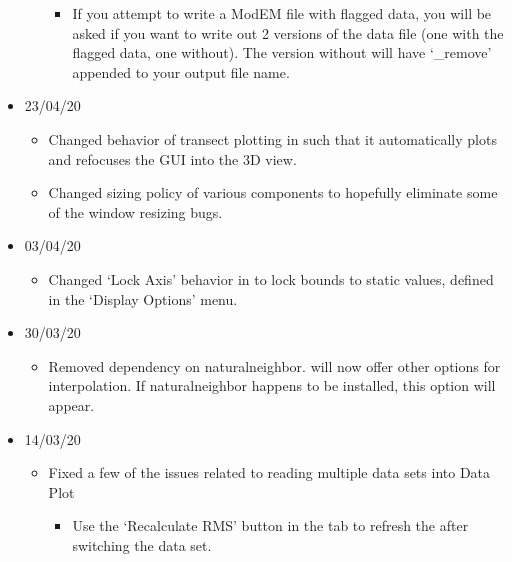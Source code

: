 \documentclass[letterpaper,10pt,english]{sphinxmanual}
\begin{document}
\begin{itemize}
\begin{itemize}
\begin{itemize}
\item {} 
If you attempt to write a ModEM file with flagged data, you will be asked if you want to write out 2 versions of the data file (one with the flagged data, one without). The version without will have ‘\_remove’ appended to your output file name.

\end{itemize}

\end{itemize}

\item {} 
23/04/20
\begin{itemize}
\item {} 
Changed behavior of transect plotting in {\hyperref[\detokenize{content/model_viewer/main_window:model-viewer}]{}} such that it automatically plots and refocuses the GUI into the 3D view.

\item {} 
Changed sizing policy of various {\hyperref[\detokenize{content/model_viewer/main_window:model-viewer}]{}} components to hopefully eliminate some of the window resizing bugs.

\end{itemize}

\item {} 
03/04/20
\begin{itemize}
\item {} 
Changed ‘Lock Axis’ behavior in {\hyperref[\detokenize{content/data_plot/main_window:data-plot}]{}} to lock bounds to static values, defined in the ‘Display Options’ menu.

\end{itemize}

\item {} 
30/03/20
\begin{itemize}
\item {} 
Removed dependency on naturalneighbor. {\hyperref[\detokenize{content/data_plot/main_window:data-plot}]{}} will now offer other options for interpolation. If naturalneighbor happens to be installed, this option will appear.

\end{itemize}

\item {} 
14/03/20
\begin{itemize}
\item {} 
Fixed a few of the issues related to reading multiple data sets into Data Plot
\begin{itemize}
\item {} 
Use the ‘Recalculate RMS’ button in the  tab to refresh the {\hyperref[\detokenize{content/data_plot/main_window:misfit-table}]{}} after switching the data set.


\end{itemize}
\end{itemize}
\end{itemize}
\end{document}
